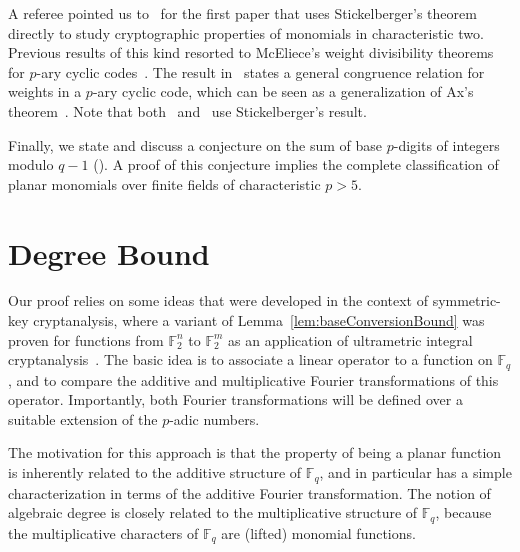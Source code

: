 \documentclass[12pt]{article}
\newcommand{\F}{\mathbb{F}}
\begin{document}
\begin{remark}
    A referee pointed us to~\cite{DBLP:journals/dcc/LangevinV05} for the first paper that uses Stickelberger's theorem directly to study cryptographic properties of monomials in characteristic two. Previous results of this kind resorted to McEliece's weight divisibility theorems for $p$-ary cyclic codes~\cite{MCELIECE197180,DBLP:journals/dm/McEliece72}. The result in~\cite{DBLP:journals/dm/McEliece72} states a general congruence relation for weights in a $p$-ary cyclic code, which can be seen as a generalization of Ax's theorem~\cite{ax1964zeroes}. Note that both~\cite{ax1964zeroes} and~\cite{DBLP:journals/dm/McEliece72} use Stickelberger's result.
\end{remark}

Finally, we state and discuss a conjecture on the sum of base $p$-digits of integers modulo $q-1$ (). A proof of this conjecture implies the complete classification of planar monomials over finite fields of characteristic $p>5$.


\section{Degree Bound}
Our proof relies on some ideas that were developed in the context of symmetric-key cryptanalysis, where a variant of Lemma~\ref{lem:baseConversionBound} was proven for functions from $\F_2^n$ to $\F_2^m$ as an application of ultrametric integral cryptanalysis~\cite{Beyne2023,DBLP:conf/asiacrypt/BeyneV24}.
The basic idea is to associate a linear operator to a function on $\F_q$, and to compare the additive and multiplicative Fourier transformations of this operator. Importantly, both Fourier transformations will be defined over a suitable extension of the $p$-adic numbers. 

The motivation for this approach is that the property of being a planar function is inherently related to the additive structure of $\F_q$, and in particular has a simple characterization in terms of the additive Fourier transformation. The notion of algebraic degree is closely related to the multiplicative structure of $\F_q$, because the multiplicative characters of $\F_q$ are (lifted) monomial functions.
\end{document}
